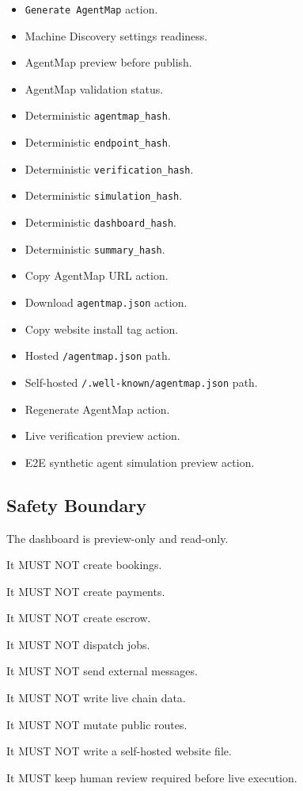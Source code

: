 \begin{itemize}
  \item \texttt{Generate AgentMap} action.
  \item Machine Discovery settings readiness.
  \item AgentMap preview before publish.
  \item AgentMap validation status.
  \item Deterministic \texttt{agentmap\_hash}.
  \item Deterministic \texttt{endpoint\_hash}.
  \item Deterministic \texttt{verification\_hash}.
  \item Deterministic \texttt{simulation\_hash}.
  \item Deterministic \texttt{dashboard\_hash}.
  \item Deterministic \texttt{summary\_hash}.
  \item Copy AgentMap URL action.
  \item Download \texttt{agentmap.json} action.
  \item Copy website install tag action.
  \item Hosted \texttt{/agentmap.json} path.
  \item Self-hosted \texttt{/.well-known/agentmap.json} path.
  \item Regenerate AgentMap action.
  \item Live verification preview action.
  \item E2E synthetic agent simulation preview action.
\end{itemize}

\subsection{Safety Boundary}

The dashboard is preview-only and read-only.

It MUST NOT create bookings.

It MUST NOT create payments.

It MUST NOT create escrow.

It MUST NOT dispatch jobs.

It MUST NOT send external messages.

It MUST NOT write live chain data.

It MUST NOT mutate public routes.

It MUST NOT write a self-hosted website file.

It MUST keep human review required before live execution.

